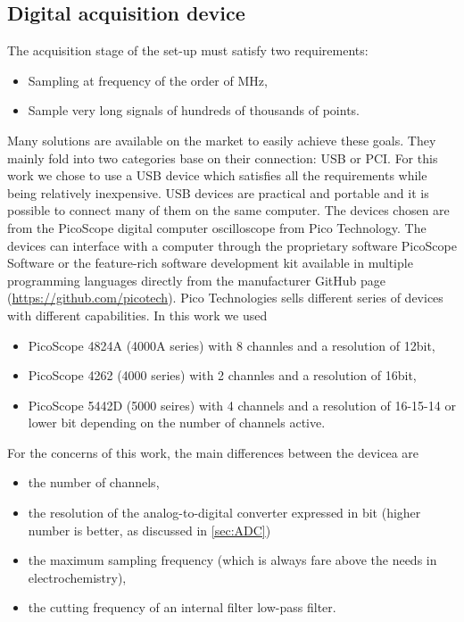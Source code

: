 \subsection{Digital acquisition device}

The acquisition stage of the set-up must satisfy two requirements:
\begin{itemize}
    \item Sampling at frequency of the order of MHz,
    \item Sample very long signals of hundreds of thousands of points.
\end{itemize}
Many solutions are available on the market to easily achieve these goals. They mainly fold into two categories base on their connection: USB or PCI. For this work we chose to use a USB device which satisfies all the requirements while being relatively inexpensive. USB devices are practical and portable and it is possible to connect many of them on the same computer. The devices chosen are from the PicoScope digital computer oscilloscope from Pico Technology. The devices can interface with a computer through the proprietary software PicoScope Software or the feature-rich software development kit available in multiple programming languages directly from the manufacturer GitHub page (\url{https://github.com/picotech}). Pico Technologies sells different series of devices with different capabilities. In this work we used 
\begin{itemize}
    \item PicoScope 4824A (4000A series) with 8 channles and a resolution of 12bit,
    \item PicoScope 4262 (4000 series) with 2 channles and a resolution of 16bit,
    \item PicoScope 5442D (5000 seires) with 4 channels and a resolution of 16-15-14 or lower bit depending on the number of channels active.
\end{itemize}
For the concerns of this work, the main differences between the devicea are
\begin{itemize}
    \item the number of channels,
    \item the resolution of the analog-to-digital converter expressed in bit (higher number is better, as discussed in \ref{sec:ADC})
    \item the maximum sampling frequency (which is always fare above the needs in electrochemistry),
    \item the cutting frequency of an internal filter low-pass filter.
\end{itemize}
